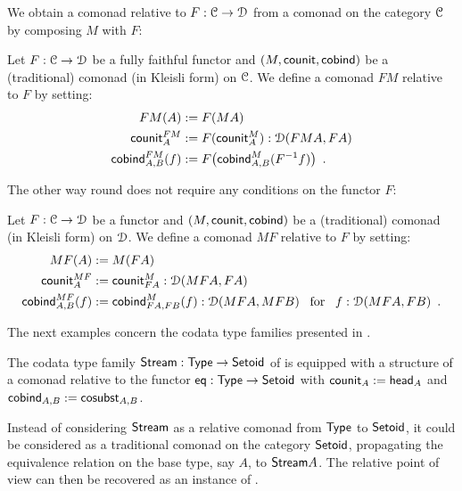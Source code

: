 \documentclass[a4paper,USenglish]{lipics}
\begin{document}
\begin{Long}
We obtain a comonad relative to $F:{\mathcal{C}}\to\mathcal{D}$ from a comonad on the category ${\mathcal{C}}$ by composing $M$ with $F$:
\begin{ex}\label{ex_relcom_from_com}
  Let $F : {\mathcal{C}} \to \mathcal{D}$ be a fully faithful functor and $(M,\mathsf{counit},\mathsf{cobind})$ be a (traditional) comonad (in Kleisli form) on ${\mathcal{C}}$.
  We define a comonad $FM$ relative to $F$ by setting:
   \begin{align*}
        FM(A) &:= F(MA) \\
        \mathsf{counit}^{FM}_A &:= F(\mathsf{counit}^M_A) : \mathcal{D}(FMA,FA) \\
        \mathsf{cobind}^{FM}_{A,B} (f) &:= F\bigl(\mathsf{cobind}^M_{A,B}(F^{-1}f)\bigr) \enspace .
    \end{align*}

\end{ex}

\noindent
The other way round does not require any conditions on the functor $F$:
\begin{ex}\label{ex_relcom_from_com_on_target}
    Let $F : {\mathcal{C}} \to \mathcal{D}$ be a functor and $(M,\mathsf{counit},\mathsf{cobind})$ be a (traditional) comonad (in Kleisli form) on $\mathcal{D}$.
  We define a comonad $MF$ relative to $F$ by setting:
  \begin{align*}
      MF(A) &:= M(FA)\\
      \mathsf{counit}^{MF}_A &:= \mathsf{counit}^M_{FA} : \mathcal{D}(MFA,FA) \\
      \mathsf{cobind}^{MF}_{A,B} (f) &:= \mathsf{cobind}^M_{FA,FB}(f) : \mathcal{D}(MFA,MFB) \enspace \text{ for } \enspace f : \mathcal{D}(MFA,FB) \enspace .
  \end{align*}
\end{ex}


\end{Long}

\noindent
The next examples concern the codata type families presented in .

\begin{ex}[Streams]\label{ex_stream_comonad}
  The codata type family $\mathsf{Stream} : \mathsf{Type} \to \mathsf{Setoid}$ of  is equipped with a structure of a comonad relative to the functor 
  $\mathsf{eq} : \mathsf{Type} \to \mathsf{Setoid}$ with
   $\mathsf{counit}_A := \mathsf{head}_A$ and
   $\mathsf{cobind}_{A,B} := \mathsf{cosubst}_{A,B}$.
\end{ex}

\begin{Long}
\begin{rem}
 Instead of considering $\mathsf{Stream}$ as a relative comonad from $\mathsf{Type}$ to $\mathsf{Setoid}$, it could be considered as a traditional comonad on the 
 category $\mathsf{Setoid}$, propagating the equivalence relation on the base type, say $A$, to $\mathsf{Stream} A$.
 The relative point of view can then be recovered as an instance of .
\end{rem}
\end{Long}
\end{document}
